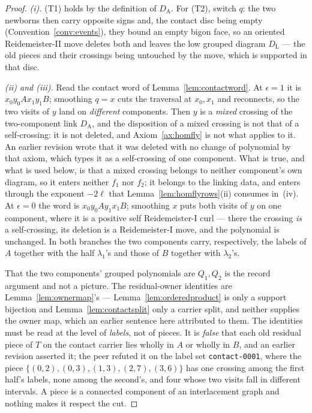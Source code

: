 \begin{proof}
\emph{(i).} (T1) holds by the definition of $D_{\mathrm A}$. For (T2), switch
$q$: the two newborns then carry opposite signs and, the contact disc being
empty (Convention~\ref{conv:events}), they bound an empty bigon face, so an
oriented Reidemeister-II move deletes both and leaves the low grouped diagram
$D_{\mathrm L}$ --- the old pieces and their crossings being untouched by the
move, which is supported in that disc.

\emph{(ii) and (iii).} Read the contact word of Lemma~\ref{lem:contactword}. At
$\epsilon=1$ it is $x_0y_0Ax_1y_1B$; smoothing $q=x$ cuts the traversal at
$x_0,x_1$ and reconnects, so the two visits of $y$ land on \emph{different}
components. Then $y$ is a \emph{mixed} crossing of the two-component link
$D_{\mathrm A}$, and the disposition of a mixed crossing is not that of a
self-crossing: it is not deleted, and Axiom~\ref{ax:homfly} is not what applies
to it. An earlier revision wrote that it was deleted with no change of
polynomial by that axiom, which types it as a self-crossing of one component.
What is true, and what is used below, is that a mixed crossing belongs to
neither component's own diagram, so it enters neither $f_1$ nor $f_2$; it
belongs to the linking data, and enters through the exponent $-2\ell$ that
Lemma~\ref{lem:homflyrows}(ii) consumes in~(iv). At $\epsilon=0$ the word is
$x_0y_0Ay_1x_1B$; smoothing $x$ puts both visits of $y$ on one component, where
it is a positive self Reidemeister-I curl --- there the crossing \emph{is} a
self-crossing, its deletion is a Reidemeister-I move, and the polynomial is
unchanged. In both branches the two components carry, respectively, the
labels of $A$ together with the half $\lambda_1$'s and those of $B$ together
with $\lambda_2$'s.

That the two components' grouped polynomials are $Q_1,Q_2$ is the record
argument and not a picture. The residual-owner identities are
Lemma~\ref{lem:ownermap}'s --- Lemma~\ref{lem:orderedproduct} is only a support
bijection and Lemma~\ref{lem:contactsplit} only a carrier split, and neither
supplies the owner map, which an earlier sentence here attributed to them.
The identities must be read at the level of \emph{labels}, not of pieces. It is \emph{false} that each
old residual piece of $T$ on the contact carrier lies wholly in $A$ or wholly in
$B$, and an earlier revision asserted it; the peer refuted it on the label set
\texttt{contact-0001}, where the piece
$\{(0,2),(0,3),(1,3),(2,7),(3,6)\}$ has one crossing among the first half's
labels, none among the second's, and four whose two visits fall in different
intervals. A piece is a connected component of an interlacement graph and
nothing makes it respect the cut.


\end{proof}
